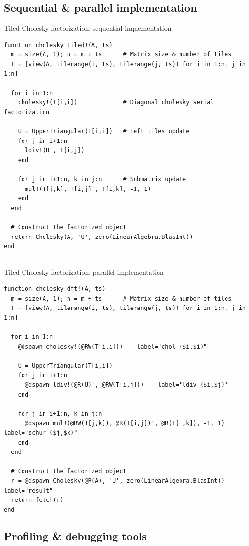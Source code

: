 \documentclass{beamer}
\begin{document}
\subsection{Sequential \& parallel implementation}

\begin{frame}[fragile]{Tiled Cholesky factorization: sequential implementation}
  \begin{verbatim}
function cholesky_tiled!(A, ts)
  m = size(A, 1); n = m ÷ ts      # Matrix size & number of tiles
  T = [view(A, tilerange(i, ts), tilerange(j, ts)) for i in 1:n, j in 1:n]

  for i in 1:n
    cholesky!(T[i,i])             # Diagonal cholesky serial factorization

    U = UpperTriangular(T[i,i])   # Left tiles update
    for j in i+1:n
      ldiv!(U', T[i,j])
    end

    for j in i+1:n, k in j:n      # Submatrix update
      mul!(T[j,k], T[i,j]', T[i,k], -1, 1)
    end
  end

  # Construct the factorized object
  return Cholesky(A, 'U', zero(LinearAlgebra.BlasInt))
end
  
  \end{verbatim}
\end{frame}


\begin{frame}[fragile]{Tiled Cholesky factorization: parallel implementation}
  \begin{verbatim}
function cholesky_dft!(A, ts)
  m = size(A, 1); n = m ÷ ts      # Matrix size & number of tiles
  T = [view(A, tilerange(i, ts), tilerange(j, ts)) for i in 1:n, j in 1:n]

  for i in 1:n
    @dspawn cholesky!(@RW(T[i,i]))    label="chol ($i,$i)"

    U = UpperTriangular(T[i,i])
    for j in i+1:n
      @dspawn ldiv!(@R(U)', @RW(T[i,j]))    label="ldiv ($i,$j)"
    end

    for j in i+1:n, k in j:n
      @dspawn mul!(@RW(T[j,k]), @R(T[i,j])', @R(T[i,k]), -1, 1) label="schur ($j,$k)"
    end
  end

  # Construct the factorized object
  r = @dspawn Cholesky(@R(A), 'U', zero(LinearAlgebra.BlasInt)) label="result"
  return fetch(r)
end 
  \end{verbatim}
\end{frame}

\subsection{Profiling \& debugging tools}
\end{document}
